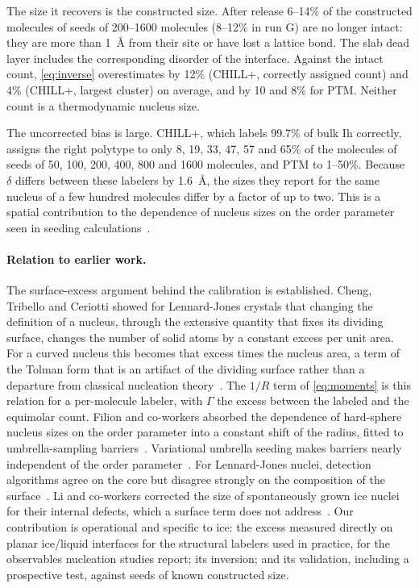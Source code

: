 \documentclass[11pt,a4paper]{article}
\begin{document}
The size it recovers is the constructed size. After release 6--14\% of the
constructed molecules of seeds of 200--1600 molecules (8--12\% in run G) are
no longer intact: they are more than 1~\AA{} from their site or have lost a
lattice bond. The slab dead layer includes the corresponding disorder of the
interface. Against the intact count, \cref{eq:inverse} overestimates by 12\%
(CHILL+, correctly assigned count) and 4\% (CHILL+, largest cluster) on
average, and by 10 and 8\% for PTM. Neither count is a thermodynamic nucleus
size.

The uncorrected bias is large. CHILL+, which labels 99.7\% of bulk Ih
correctly, assigns the right polytype to only 8, 19, 33, 47, 57 and 65\% of the
molecules of seeds of 50, 100, 200, 400, 800 and 1600 molecules, and PTM to
1--50\%. Because $\delta$ differs between these labelers by 1.6~\AA, the
sizes they report for the same nucleus of a few hundred molecules differ by
a factor of up to two. This is a spatial contribution to the dependence of
nucleus sizes on the order parameter seen in seeding
calculations~\cite{Espinosa2016,SanchezBurgos2022,Gispen2024}.

\paragraph{Relation to earlier work.} The surface-excess argument behind the
calibration is established. Cheng, Tribello and Ceriotti showed for
Lennard-Jones crystals that changing the definition of a nucleus, through
the extensive quantity that fixes its dividing surface, changes the number
of solid atoms by a constant excess per unit area. For a curved nucleus this
becomes that excess times the nucleus area, a term of the Tolman form that is
an artifact of the dividing surface rather than a departure from classical
nucleation theory~\cite{Cheng2017}. The $1/R$ term of \cref{eq:moments} is
this relation for a per-molecule labeler, with $\Gamma$ the excess between
the labeled and the equimolar count. Filion and co-workers absorbed the
dependence of hard-sphere nucleus sizes on the order parameter into a
constant shift of the radius, fitted to umbrella-sampling
barriers~\cite{Filion2010}. Variational umbrella seeding makes barriers
nearly independent of the order parameter~\cite{Gispen2024}. For
Lennard-Jones nuclei, detection algorithms agree on the core but disagree
strongly on the composition of the surface~\cite{Gispen2025}. Li and
co-workers corrected the size of spontaneously grown ice nuclei for their
internal defects, which a surface term does not address~\cite{Li2025}. Our contribution is operational
and specific to ice: the excess measured directly on planar ice/liquid
interfaces for the structural labelers used in practice, for the observables
nucleation studies report; its inversion; and its validation, including a
prospective test, against seeds of known constructed size.
\end{document}
